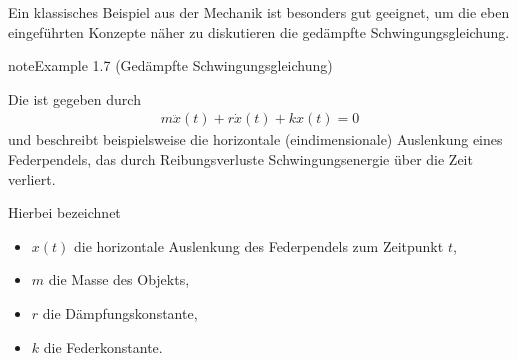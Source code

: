 \documentclass[letterpaper,10pt,english]{jupyterBook}
\begin{document}
\sphinxAtStartPar
Ein klassisches Beispiel aus der Mechanik ist besonders gut geeignet, um die eben eingeführten Konzepte näher zu diskutieren \sphinxhyphen{} die gedämpfte Schwingungsgleichung.
\label{ode/fluesse:ex:oscillations}
\begin{sphinxadmonition}{note}{Example 1.7 (Gedämpfte Schwingungsgleichung)}



\sphinxAtStartPar
Die  ist gegeben durch
\begin{equation}\label{equation:ode/fluesse:eq:schwingungsgleichung}
\begin{split}m\ddot{x}(t) + r\dot{x}(t) + kx(t)=0\end{split}
\end{equation}
\sphinxAtStartPar
und beschreibt beispielsweise die horizontale (eindimensionale) Auslenkung eines Federpendels, das durch Reibungsverluste Schwingungsenergie über die Zeit verliert.

\sphinxAtStartPar
Hierbei bezeichnet
\begin{itemize}
\item {} 
\sphinxAtStartPar
\(x(t)\) die horizontale Auslenkung des Federpendels zum Zeitpunkt \(t\),

\item {} 
\sphinxAtStartPar
\(m\) die Masse des Objekts,

\item {} 
\sphinxAtStartPar
\(r\) die Dämpfungskonstante,

\item {} 
\sphinxAtStartPar
\(k\) die Federkonstante.

\end{itemize}


\end{sphinxadmonition}
\end{document}
